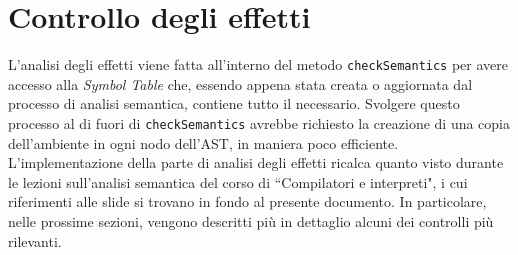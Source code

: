 \documentclass[../report.tex]{subfiles}
\begin{document}
\section{Controllo degli effetti}\label{s:controllo-effetti}
L'analisi degli effetti viene fatta all'interno del metodo \verb|checkSemantics| per avere accesso alla \textit{Symbol Table} che, essendo appena stata creata o aggiornata dal processo di analisi semantica, contiene tutto il necessario.
Svolgere questo processo al di fuori di \verb|checkSemantics| avrebbe richiesto la creazione di una copia dell'ambiente in ogni nodo dell'AST, in maniera poco efficiente.\\
\noindent
\noindent
L'implementazione della parte di analisi degli effetti ricalca quanto visto durante le lezioni sull'analisi semantica del corso di ``Compilatori e interpreti", i cui riferimenti alle slide si trovano in fondo al presente documento.
In particolare, nelle prossime sezioni, vengono descritti più in dettaglio alcuni dei controlli più rilevanti.
\end{document}
